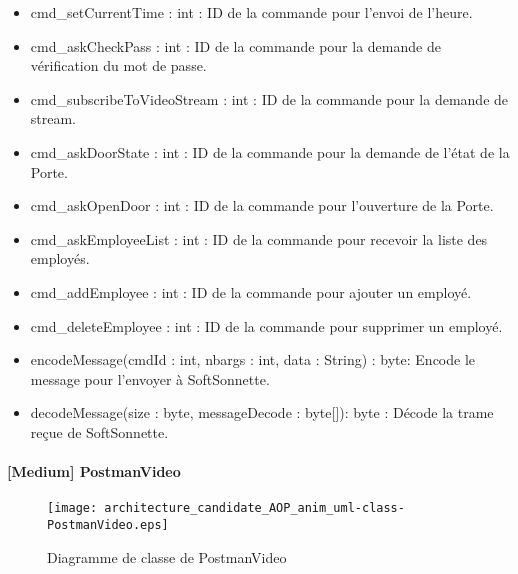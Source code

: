             \begin{itemize}
                \item {cmd\_setCurrentTime : int : ID de la commande pour l'envoi de l'heure.}
                \item {cmd\_askCheckPass : int : ID de la commande pour la demande de vérification du mot de passe.}
                \item {cmd\_subscribeToVideoStream : int : ID de la commande pour la demande de stream.}
                \item {cmd\_askDoorState : int : ID de la commande pour la demande de l'état de la Porte.}
                \item {cmd\_askOpenDoor : int : ID de la commande pour l'ouverture de la Porte.}
                \item {cmd\_askEmployeeList : int : ID de la commande pour recevoir la liste des employés.}
                \item {cmd\_addEmployee : int : ID de la commande pour ajouter un employé.}
                \item {cmd\_deleteEmployee : int : ID de la commande pour supprimer un employé.}
            \end{itemize} 
            \begin{itemize}
                \item {encodeMessage(cmdId : int, nbargs : int, data : String) : byte: Encode le message pour l'envoyer à SoftSonnette.}
                \item {decodeMessage(size : byte, messageDecode : byte[]): byte : Décode la trame reçue de SoftSonnette.}
            \end{itemize} 

\newpage   
        
    \paragraph{[Medium] PostmanVideo}%

    \begin{figure} [H]
        \centering
        \texttt{[image: architecture\_candidate\_AOP\_anim\_uml-class-PostmanVideo.eps]}
        \caption{Diagramme de classe de PostmanVideo}
        \label{Classe-PostmanVideo}
    \end{figure}
        
